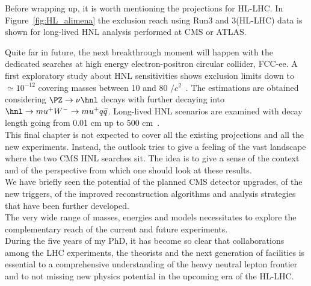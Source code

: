 Before wrapping up, it is worth mentioning the projections for
HL-LHC. In Figure~\ref{fig:HL_alimena} the exclusion reach using Run3
and 3\abinv (HL-LHC) data is shown for long-lived HNL analysis
performed at CMS or ATLAS. 

Quite far in future, the next breakthrough moment will happen with the
dedicated searches at high energy electron-positron circular collider,
FCC-ee. A first exploratory study about HNL sensitivities shows exclusion limits
down to \mixpar $\simeq 10^{-12}$ covering \hnl masses between 10 and
80 \GeV$/c^2$~\cite{blondel2014search}. The estimations are obtained
considering $\PZ \rightarrow \nu \hnl$ decays with \hnl further
decaying into
$\hnl \rightarrow mu^{+} W^{-} \rightarrow mu^{+}
q\bar{q}$. Long-lived HNL scenarios are examined with decay length
going from 0.01 cm up to 500 cm~\cite{blondel2014search}.\\


This final chapter is not expected to cover all the existing projections and all the new
experiments. 
Instead, the outlook tries to give a feeling of the vast landscape
where the two CMS HNL searches sit. The idea is to give a sense of the
context and of the perspective from which one should look at these results. \\
We have briefly seen the potential of the planned CMS detector
upgrades, of the new triggers, of the improved reconstruction algorithms and analysis strategies that
have been further developed. \\
The very wide range of masses, energies and models necessitates to
explore the complementary reach of the current and future experiments.\\
During the five years of my PhD, it has become so clear that collaborations
among the LHC experiments, the theorists and the next generation of
facilities is essential to a comprehensive
understanding of the heavy neutral lepton frontier and to not missing
new physics potential in the upcoming era of the HL-LHC.






















